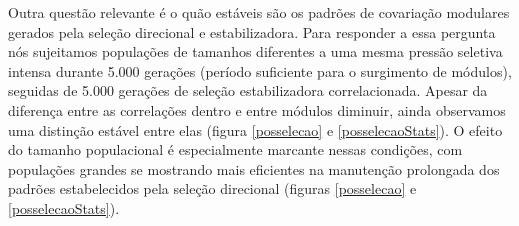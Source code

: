 Outra questão relevante é o quão estáveis são os padrões de covariação
modulares gerados pela seleção direcional e estabilizadora. 
Para responder a essa pergunta nós sujeitamos populações de tamanhos
diferentes a uma mesma pressão seletiva intensa durante 5.000 gerações
(período suficiente para o surgimento de módulos), seguidas de 5.000
gerações de seleção estabilizadora correlacionada. 
Apesar da diferença entre as correlações dentro e entre módulos
diminuir, ainda observamos uma distinção estável entre elas (figura
\ref{posselecao} e \ref{posselecaoStats}). 
O efeito do tamanho populacional é especialmente marcante nessas
condições, com populações grandes se mostrando mais eficientes na
manutenção prolongada dos padrões estabelecidos pela seleção direcional
(figuras \ref{posselecao} e \ref{posselecaoStats}). 


